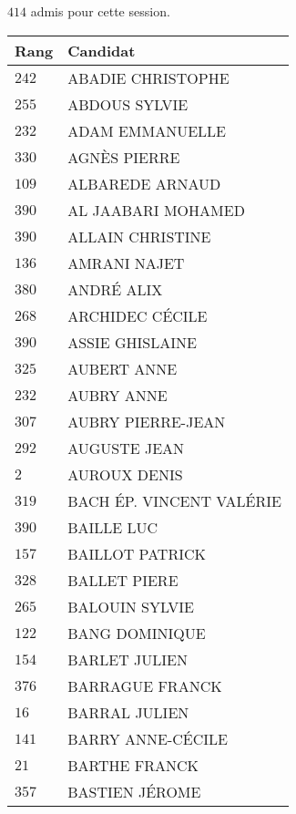 




  $414$ admis pour cette session.

  \begin{xltabular}{\linewidth}{|l|X|}
    \hline
    \textbf{Rang} & \textbf{Candidat} \\
    \hline
    $242$ & ABADIE CHRISTOPHE \\
    \hline
    $255$ & ABDOUS SYLVIE \\
    \hline
    $232$ & ADAM EMMANUELLE \\
    \hline
    $330$ & AGNÈS PIERRE \\
    \hline
    $109$ & ALBAREDE ARNAUD \\
    \hline
    $390$ & AL JAABARI MOHAMED \\
    \hline
    $390$ & ALLAIN CHRISTINE \\
    \hline
    $136$ & AMRANI NAJET \\
    \hline
    $380$ & ANDRÉ ALIX \\
    \hline
    $268$ & ARCHIDEC CÉCILE \\
    \hline
    $390$ & ASSIE GHISLAINE \\
    \hline
    $325$ & AUBERT ANNE \\
    \hline
    $232$ & AUBRY ANNE \\
    \hline
    $307$ & AUBRY PIERRE-JEAN \\
    \hline
    $292$ & AUGUSTE JEAN \\
    \hline
    $2$ & AUROUX DENIS \\
    \hline
    $319$ & BACH ÉP. VINCENT VALÉRIE \\
    \hline
    $390$ & BAILLE LUC \\
    \hline
    $157$ & BAILLOT PATRICK \\
    \hline
    $328$ & BALLET PIERE \\
    \hline
    $265$ & BALOUIN SYLVIE \\
    \hline
    $122$ & BANG DOMINIQUE \\
    \hline
    $154$ & BARLET JULIEN \\
    \hline
    $376$ & BARRAGUE FRANCK \\
    \hline
    $16$ & BARRAL JULIEN \\
    \hline
    $141$ & BARRY ANNE-CÉCILE \\
    \hline
    $21$ & BARTHE FRANCK \\
    \hline
    $357$ & BASTIEN JÉROME \\

\end{xltabular}
